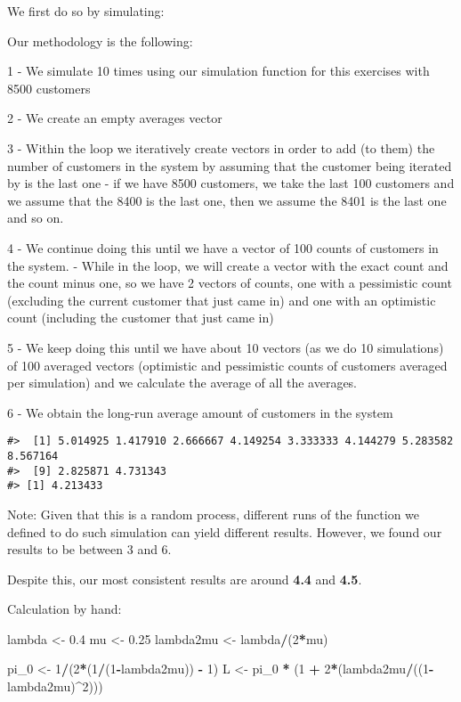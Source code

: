 \documentclass[]{article}
\newenvironment{Shaded}{\begin{snugshade}}{\end{snugshade}}
\newcommand{\DecValTok}[1]{\textcolor[rgb]{0.00,0.00,0.81}{#1}}
\newcommand{\FloatTok}[1]{\textcolor[rgb]{0.00,0.00,0.81}{#1}}
\newcommand{\NormalTok}[1]{#1}
\newcommand{\OperatorTok}[1]{\textcolor[rgb]{0.81,0.36,0.00}{\textbf{#1}}}
\newcommand{\StringTok}[1]{\textcolor[rgb]{0.31,0.60,0.02}{#1}}
\begin{document}
We first do so by simulating:

Our methodology is the following:

1 - We simulate 10 times using our simulation function for this
exercises with 8500 customers

2 - We create an empty averages vector

3 - Within the loop we iteratively create vectors in order to add (to
them) the number of customers in the system by assuming that the
customer being iterated by is the last one - if we have 8500 customers,
we take the last 100 customers and we assume that the 8400 is the last
one, then we assume the 8401 is the last one and so on.

4 - We continue doing this until we have a vector of 100 counts of
customers in the system. - While in the loop, we will create a vector
with the exact count and the count minus one, so we have 2 vectors of
counts, one with a pessimistic count (excluding the current customer
that just came in) and one with an optimistic count (including the
customer that just came in)

5 - We keep doing this until we have about 10 vectors (as we do 10
simulations) of 100 averaged vectors (optimistic and pessimistic counts
of customers averaged per simulation) and we calculate the average of
all the averages.

6 - We obtain the long-run average amount of customers in the system

\begin{verbatim}
#>  [1] 5.014925 1.417910 2.666667 4.149254 3.333333 4.144279 5.283582 8.567164
#>  [9] 2.825871 4.731343
#> [1] 4.213433
\end{verbatim}

Note: Given that this is a random process, different runs of the
function we defined to do such simulation can yield different results.
However, we found our results to be between 3 and 6.

Despite this, our most consistent results are around \textbf{4.4} and
\textbf{4.5}.

Calculation by hand:

\begin{Shaded}
\begin{Highlighting}[]
\NormalTok{lambda <-}\StringTok{ }\FloatTok{0.4}
\NormalTok{mu <-}\StringTok{ }\FloatTok{0.25}
\NormalTok{lambda2mu <-}\StringTok{ }\NormalTok{lambda}\OperatorTok{/}\NormalTok{(}\DecValTok{2}\OperatorTok{*}\NormalTok{mu)}

\NormalTok{pi_}\DecValTok{0}\NormalTok{ <-}\StringTok{ }\DecValTok{1}\OperatorTok{/}\NormalTok{(}\DecValTok{2}\OperatorTok{*}\NormalTok{(}\DecValTok{1}\OperatorTok{/}\NormalTok{(}\DecValTok{1}\OperatorTok{-}\NormalTok{lambda2mu)) }\OperatorTok{-}\StringTok{ }\DecValTok{1}\NormalTok{)}
\NormalTok{L <-}\StringTok{ }\NormalTok{pi_}\DecValTok{0} \OperatorTok{*}\StringTok{ }\NormalTok{(}\DecValTok{1} \OperatorTok{+}\StringTok{ }\DecValTok{2}\OperatorTok{*}\NormalTok{(lambda2mu}\OperatorTok{/}\NormalTok{((}\DecValTok{1}\OperatorTok{-}\NormalTok{lambda2mu)}\OperatorTok{^}\DecValTok{2}\NormalTok{)))}
\end{Highlighting}
\end{Shaded}
\end{document}
